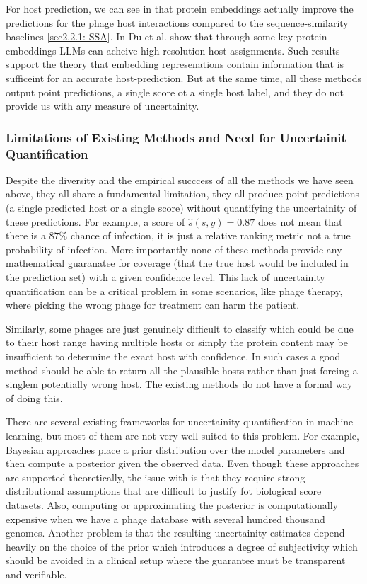\vspace{0.15cm}
\noindent For host prediction, we can see in \cite{gonzales2023protein} that protein embeddings actually improve the 
predictions for the phage host interactions compared to the sequence-similarity baselines \ref{sec2.2.1: SSA}. In 
\cite{du2026high} Du et al. show that through some key protein embeddings LLMs can acheive high resolution host assignments.
Such results support the theory that embedding represenations contain information that is sufficeint for an accurate 
host-prediction. But at the same time, all these methods output point predictions, a single score ot a single host label,
and they do not provide us with any measure of uncertainity.


\subsubsection{Limitations of Existing Methods and Need for Uncertainit Quantification}
\label{sec2.2.4: limitations}
\noindent Despite the diversity and the empirical succcess of all the methods we have seen above, they all share a fundamental
limitation, they all produce point predictions (a single predicted host or a single score) without quantifying the uncertainity 
of these predictions. For example, a score of $\hat s (s,y) = 0.87$ does not mean that there is a $87\%$ chance of infection, 
it is just a relative ranking metric not a true probability of infection. More importantly none of these methods provide any mathematical guaranatee for coverage (that the true host would
be included in the prediction set) with a given confidence level. This lack of uncertainity quantification can be a 
critical problem in some scenarios, like phage therapy, where picking the wrong phage for treatment can harm the patient.

\vspace{0.15cm}
\noindent Similarly, some phages are just genuinely difficult to classify which could be due to their host range having 
multiple hosts or simply the protein content may be insufficient to determine the exact host with confidence. In such cases
a good method should be able to return all the plausible hosts rather than just forcing a singlem potentially wrong host. 
The existing methods do not have a formal way of doing this.

\vspace{0.15cm}
\noindent There are several existing frameworks for uncertainity quantification in machine learning, but most of them are
not very well suited to this problem. For example, Bayesian approaches place a prior distribution over the model parameters
and then compute a posterior given the observed data. Even though these approaches are supported theoretically, the issue 
with is that they require strong distributional assumptions that are difficult to justify fot biological score datasets. Also, 
computing or approximating the posterior is computationally expensive when we have a phage database with several hundred
thousand genomes. Another problem is that the resulting uncertainity estimates depend heavily on the choice of the prior
which introduces a degree of subjectivity which should be avoided in a clinical setup where the guarantee must be transparent
and verifiable.

